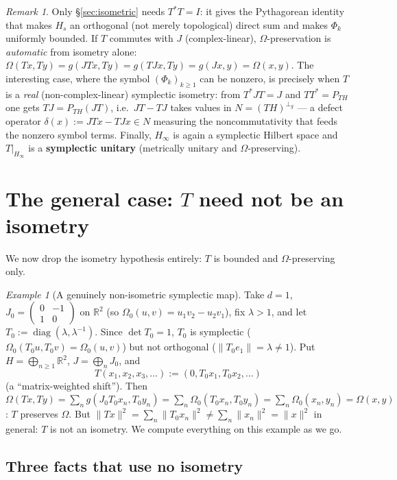 \documentclass[11pt,a4paper]{article}
\theoremstyle{definition}
\theoremstyle{remark}
\newtheorem{remark}[theorem]{Remark}
\newtheorem{example}[theorem]{Example}
\newcommand{\R}{\mathbb{R}}
\newcommand{\cJ}{J}
\newcommand{\Om}{\Omega}
\newcommand{\pg}{\perp_g}
\begin{document}
\begin{remark}
Only \S\ref{sec:isometric} needs $T^{*}T=I$: it gives the Pythagorean identity that makes
$H_s$ an orthogonal (not merely topological) direct sum and makes $\Phi_k$ uniformly
bounded. If $T$ commutes with $\cJ$ (complex-linear), $\Om$-preservation is \emph{automatic}
from isometry alone: $\Om(Tx,Ty)=g(\cJ Tx,Ty)=g(T\cJ x,Ty)=g(\cJ x,y)=\Om(x,y)$. The
interesting case, where the symbol $(\Phi_k)_{k\ge1}$ can be nonzero, is precisely when $T$
is a \emph{real} (non-complex-linear) symplectic isometry: from $T^{*}\cJ T=\cJ$ and
$TT^{*}=P_{TH}$ one gets $T\cJ=P_{TH}(\cJ T)$, i.e.\ $\cJ T-T\cJ$ takes values in
$N=(TH)^{\pg}$ --- a defect operator $\delta(x):=\cJ Tx-T\cJ x\in N$ measuring the
noncommutativity that feeds the nonzero symbol terms. Finally, $H_\infty$ is again a
symplectic Hilbert space and $T|_{H_\infty}$ is a \textbf{symplectic unitary} (metrically
unitary and $\Om$-preserving).
\end{remark}

\section{The general case: $T$ need not be an isometry}
\label{sec:general}

We now drop the isometry hypothesis entirely: $T$ is bounded and $\Om$-preserving only.

\begin{example}[A genuinely non-isometric symplectic map]
\label{ex:running}
Take $d=1$, $J_0=\begin{pmatrix}0&-1\\1&0\end{pmatrix}$ on $\R^2$ (so
$\Om_0(u,v)=u_1v_2-u_2v_1$), fix $\lambda>1$, and let $T_0:=\operatorname{diag}(\lambda,\lambda^{-1})$.
Since $\det T_0=1$, $T_0$ is symplectic ($\Om_0(T_0u,T_0v)=\Om_0(u,v)$) but not orthogonal
($\|T_0e_1\|=\lambda\ne1$). Put $H=\bigoplus_{n\ge1}\R^2$, $\cJ=\bigoplus_nJ_0$, and
\[
T(x_1,x_2,x_3,\dots):=(0,T_0x_1,T_0x_2,\dots)
\]
(a ``matrix-weighted shift''). Then
$\Om(Tx,Ty)=\sum_ng(J_0T_0x_n,T_0y_n)=\sum_n\Om_0(T_0x_n,T_0y_n)=\sum_n\Om_0(x_n,y_n)=\Om(x,y)$:
$T$ preserves $\Om$. But $\|Tx\|^2=\sum_n\|T_0x_n\|^2\ne\sum_n\|x_n\|^2=\|x\|^2$ in general:
$T$ is not an isometry. We compute everything on this example as we go.
\end{example}

\subsection{Three facts that use no isometry}
\end{document}
